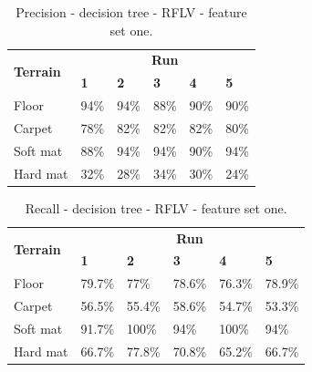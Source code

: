 \documentclass[USenglish]{ifimaster}  %
\begin{document}
\begin{table}[h]
	\begin{subtable}[h]{1\textwidth}
		\centering
		\captionsetup{justification=centering}
		\begin{tabular}{@{}llllll@{}}
			\toprule
			\multirow{2}{*}{\textbf{Terrain}} & \multicolumn{5}{c}{\textbf{Run}} \\ \cmidrule(l){2-6} 
			& \multicolumn{1}{l|}{\textbf{1}} & \multicolumn{1}{l|}{\textbf{2}} & \multicolumn{1}{l|}{\textbf{3}} & \multicolumn{1}{l|}{\textbf{4}} & \textbf{5} \\ \midrule
			\multicolumn{1}{l|}{Floor} & \multicolumn{1}{l|}{94\%} & \multicolumn{1}{l|}{94\%} & \multicolumn{1}{l|}{88\%} & \multicolumn{1}{l|}{90\%} & 90\% \\ \midrule
			\multicolumn{1}{l|}{Carpet} & \multicolumn{1}{l|}{78\%} & \multicolumn{1}{l|}{82\%} & \multicolumn{1}{l|}{82\%} & \multicolumn{1}{l|}{82\%} & 80\% \\ \midrule
			\multicolumn{1}{l|}{Soft mat} & \multicolumn{1}{l|}{88\%} & \multicolumn{1}{l|}{94\%} & \multicolumn{1}{l|}{94\%} & \multicolumn{1}{l|}{90\%} & 94\% \\ \midrule
			\multicolumn{1}{l|}{Hard mat} & \multicolumn{1}{l|}{32\%} & \multicolumn{1}{l|}{28\%} & \multicolumn{1}{l|}{34\%} & \multicolumn{1}{l|}{30\%} & 24\% \\ \bottomrule
		\end{tabular}
		\caption{Precision - decision tree - RFLV - feature set one.}
		\label{dtfilterprecision}
	\end{subtable}
\end{table}
\hfill
\begin{table}[h]\ContinuedFloat
	\begin{subtable}[h]{1\textwidth}
		\centering
		\captionsetup{justification=centering}
	\begin{tabular}{@{}llllll@{}}
		\toprule
		\multirow{2}{*}{\textbf{Terrain}} & \multicolumn{5}{c}{\textbf{Run}} \\ \cmidrule(l){2-6} 
		& \multicolumn{1}{l|}{\textbf{1}} & \multicolumn{1}{l|}{\textbf{2}} & \multicolumn{1}{l|}{\textbf{3}} & \multicolumn{1}{l|}{\textbf{4}} & \textbf{5} \\ \midrule
		\multicolumn{1}{l|}{Floor} & \multicolumn{1}{l|}{79.7\%} & \multicolumn{1}{l|}{77\%} & \multicolumn{1}{l|}{78.6\%} & \multicolumn{1}{l|}{76.3\%} & 78.9\% \\ \midrule
		\multicolumn{1}{l|}{Carpet} & \multicolumn{1}{l|}{56.5\%} & \multicolumn{1}{l|}{55.4\%} & \multicolumn{1}{l|}{58.6\%} & \multicolumn{1}{l|}{54.7\%} & 53.3\% \\ \midrule
		\multicolumn{1}{l|}{Soft mat} & \multicolumn{1}{l|}{91.7\%} & \multicolumn{1}{l|}{100\%} & \multicolumn{1}{l|}{94\%} & \multicolumn{1}{l|}{100\%} & 94\% \\ \midrule
		\multicolumn{1}{l|}{Hard mat} & \multicolumn{1}{l|}{66.7\%} & \multicolumn{1}{l|}{77.8\%} & \multicolumn{1}{l|}{70.8\%} & \multicolumn{1}{l|}{65.2\%} & 66.7\% \\ \bottomrule
	\end{tabular}
	\caption{Recall - decision tree - RFLV - feature set one.}
	\label{dtfilterrecall}
	\end{subtable}
\end{table}
\end{document}
